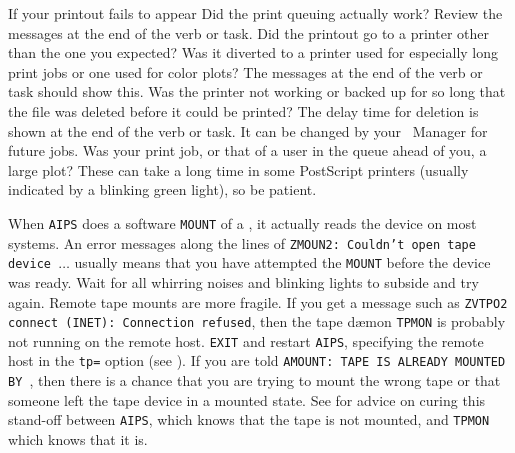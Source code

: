      If your printout fails to appear
\xben
\Item Did the print queuing actually work?  Review the
     messages at the end of the verb or task.
\Item Did the printout go to a printer other than the one you
     expected?  Was it diverted to a printer used for especially
     long print jobs or one used for color plots?  The messages at the
     end of the verb or task should show this.
\Item Was the printer not working or backed up for so long that
     the file was deleted before it could be printed?  The delay time
     for deletion is shown at the end of the verb or task.  It can be
     changed by your \AIPS\ Manager for future jobs.
\Item Was your print job, or that of a user in the queue ahead of
     you, a large plot?  These can take a long time in some PostScript
     printers (usually indicated by a blinking green light), so be
     patient.
\xeen


     When {\tt AIPS} does a software {\tt MOUNT} of a , it actually reads the device on most systems.  An error
messages along the lines of {\tt ZMOUN2: Couldn't open tape device
$\ldots$} usually means that you have attempted the {\tt MOUNT} before
the device was ready.  Wait for all whirring noises and blinking
lights to subside and try again.  Remote tape mounts are more fragile.
If you get a message such as {\tt ZVTPO2 connect (INET): Connection
refused}, then the tape d\ae mon {\tt TPMON} is probably not running
on the remote host.  {\tt EXIT} and restart {\tt AIPS}, specifying the
remote host in the {\tt tp=} option (see ).  If you are
told {\tt AMOUNT: TAPE IS ALREADY MOUNTED BY }, then there
is a chance that you are trying to mount the wrong tape or that
someone left the tape device in a mounted state.  See  for
advice on curing this stand-off between {\tt AIPS}, which knows that
the tape is not mounted, and {\tt TPMON} which knows that it is.

